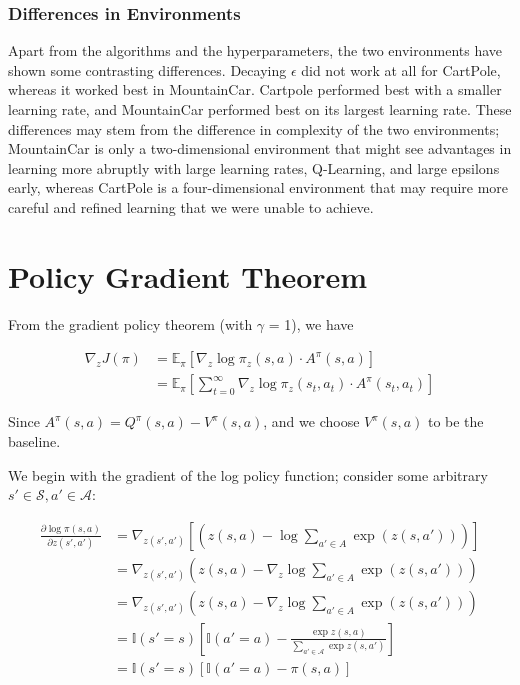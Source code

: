 \documentclass{article}
\begin{document}
\subsubsection{Differences in Environments}
Apart from the algorithms and the hyperparameters, the two environments have shown some
contrasting differences. Decaying $\epsilon$ did not work at all for CartPole, whereas
it worked best in MountainCar. Cartpole performed best with a smaller learning rate, and
MountainCar performed best on its largest learning rate. These differences may stem from the
difference in complexity of the two environments; MountainCar is only a two-dimensional environment
that might see advantages in learning more abruptly with large learning rates, Q-Learning, and large epsilons early, whereas CartPole is a four-dimensional environment
that may require more careful and refined learning that we were unable to achieve.

\section{Policy Gradient Theorem}

From the gradient policy theorem (with $\gamma$ = 1), we have

\begin{align*}
  \nabla_z J(\pi) &= \mathbb{E}_{\pi} \left [ \nabla_{z} \log \pi_{z}(s, a) \cdot A^{\pi}(s,a) \right]\\
          &= \mathbb{E}_{\pi} \left [\sum_{t=0}^\infty \nabla_{z} \log \pi_{z}(s_t, a_t) \cdot A^{\pi}(s_t,a_t) \right]
\end{align*}

Since $A^\pi(s,a) = Q^\pi(s,a) - V^\pi(s,a)$, and we choose $V^\pi(s,a)$ to be the baseline.

We begin with the gradient of the log policy function; consider some arbitrary $s' \in
\mathcal{S}, a' \in \mathcal{A}$:

\begin{align*}
  \frac{\partial\log \pi(s,a)}{\partial z(s', a')} &= \nabla_{z(s', a')}\left[(z(s,a) - \log \sum_{a'\in A} \exp(z(s,a'))) \right]\\
                          &= \nabla_{z(s', a')}(z(s,a) - \nabla_{z} \log \sum_{a'\in A} \exp(z(s,a')))\\
                          &= \nabla_{z(s', a')}(z(s,a) - \nabla_{z} \log \sum_{a'\in A} \exp(z(s,a')))\\
                          &= \mathbb{I}(s' = s) \left [ \mathbb{I}(a' = a) - \frac{\exp z(s,a)}{\sum_{a'\in \mathcal{A}} \exp z(s,a')}\right ]\\
                          &= \mathbb{I}(s' = s) \left [\mathbb{I}(a' = a) - \pi (s,a) \right]
\end{align*}
\end{document}
